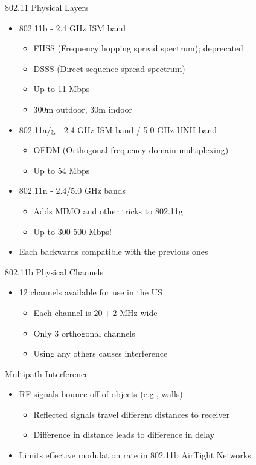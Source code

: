 \documentclass[pdf]{beamer}
\begin{document}
\begin{frame}{802.11 Physical Layers}
  \begin{itemize}
  \item 802.11b - 2.4 GHz ISM band
    \begin{itemize}
    \item  FHSS (Frequency hopping spread spectrum); deprecated
    \item  DSSS (Direct sequence spread spectrum)
    \item  Up to 11 Mbps
    \item  300m outdoor, 30m indoor 
    \end{itemize}     
  \item   802.11a/g - 2.4 GHz ISM band / 5.0 GHz UNII band
    \begin{itemize}
    \item  OFDM (Orthogonal frequency domain multiplexing)
    \item  Up to 54 Mbps
    \end{itemize}
  \item   802.11n - 2.4/5.0 GHz bands
    \begin{itemize}
    \item  Adds MIMO and other tricks to 802.11g     
    \item  Up to 300-500 Mbps!
    \end{itemize}    
  \item Each backwards compatible with the previous ones
  \end{itemize}
\end{frame}

\begin{frame}{802.11b Physical Channels}
  \begin{itemize}
  \item   12 channels available for use in the US
    \begin{itemize}
    \item  Each channel is $20+2$ MHz wide
    \item  Only 3 orthogonal channels
    \item  Using any others causes interference           %
    \end{itemize}
  \end{itemize}
\end{frame}

\begin{frame}{ Multipath Interference}
  \begin{itemize}
  \item   RF signals bounce off of objects (e.g., walls)
    \begin{itemize}
    \item  Reflected  signals travel different distances to receiver
    \item  Difference in distance leads to difference in delay
    \end{itemize}
  \item   Limits effective modulation rate in 802.11b  AirTight Networks
  \end{itemize}
\end{frame}
\end{document}
